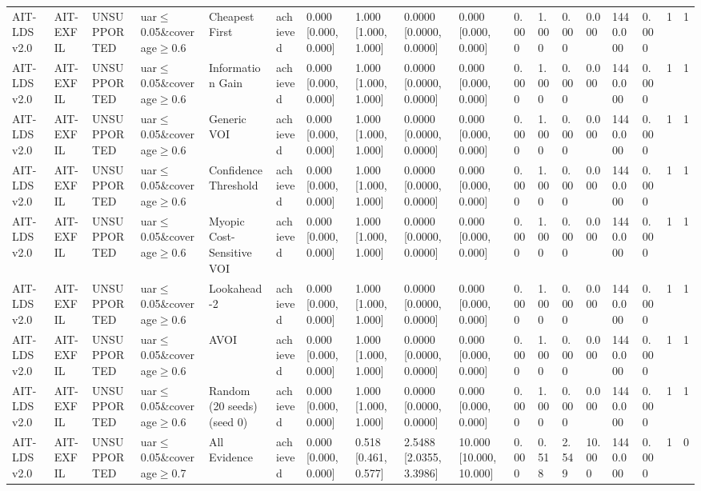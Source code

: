 \begin{table}[!ht]
{\begin{tabular}{llllllllllllllllll}
AIT-LDS v2.0 & AIT-EXFIL & UNSUPPORTED & uar$\le$0.05\&coverage$\ge$0.6 & Cheapest First & achieved & 0.000 [0.000, 0.000] & 1.000 [1.000, 1.000] & 0.0000 [0.0000, 0.0000] & 0.000 [0.000, 0.000] & 0.000 & 1.000 & 0.000 & 0.000 & 1440.000 & 0.000 & 1 & 1 \\
AIT-LDS v2.0 & AIT-EXFIL & UNSUPPORTED & uar$\le$0.05\&coverage$\ge$0.6 & Information Gain & achieved & 0.000 [0.000, 0.000] & 1.000 [1.000, 1.000] & 0.0000 [0.0000, 0.0000] & 0.000 [0.000, 0.000] & 0.000 & 1.000 & 0.000 & 0.000 & 1440.000 & 0.000 & 1 & 1 \\
AIT-LDS v2.0 & AIT-EXFIL & UNSUPPORTED & uar$\le$0.05\&coverage$\ge$0.6 & Generic VOI & achieved & 0.000 [0.000, 0.000] & 1.000 [1.000, 1.000] & 0.0000 [0.0000, 0.0000] & 0.000 [0.000, 0.000] & 0.000 & 1.000 & 0.000 & 0.000 & 1440.000 & 0.000 & 1 & 1 \\
AIT-LDS v2.0 & AIT-EXFIL & UNSUPPORTED & uar$\le$0.05\&coverage$\ge$0.6 & Confidence Threshold & achieved & 0.000 [0.000, 0.000] & 1.000 [1.000, 1.000] & 0.0000 [0.0000, 0.0000] & 0.000 [0.000, 0.000] & 0.000 & 1.000 & 0.000 & 0.000 & 1440.000 & 0.000 & 1 & 1 \\
AIT-LDS v2.0 & AIT-EXFIL & UNSUPPORTED & uar$\le$0.05\&coverage$\ge$0.6 & Myopic Cost-Sensitive VOI & achieved & 0.000 [0.000, 0.000] & 1.000 [1.000, 1.000] & 0.0000 [0.0000, 0.0000] & 0.000 [0.000, 0.000] & 0.000 & 1.000 & 0.000 & 0.000 & 1440.000 & 0.000 & 1 & 1 \\
AIT-LDS v2.0 & AIT-EXFIL & UNSUPPORTED & uar$\le$0.05\&coverage$\ge$0.6 & Lookahead-2 & achieved & 0.000 [0.000, 0.000] & 1.000 [1.000, 1.000] & 0.0000 [0.0000, 0.0000] & 0.000 [0.000, 0.000] & 0.000 & 1.000 & 0.000 & 0.000 & 1440.000 & 0.000 & 1 & 1 \\
AIT-LDS v2.0 & AIT-EXFIL & UNSUPPORTED & uar$\le$0.05\&coverage$\ge$0.6 & AVOI & achieved & 0.000 [0.000, 0.000] & 1.000 [1.000, 1.000] & 0.0000 [0.0000, 0.0000] & 0.000 [0.000, 0.000] & 0.000 & 1.000 & 0.000 & 0.000 & 1440.000 & 0.000 & 1 & 1 \\
AIT-LDS v2.0 & AIT-EXFIL & UNSUPPORTED & uar$\le$0.05\&coverage$\ge$0.6 & Random (20 seeds) (seed 0) & achieved & 0.000 [0.000, 0.000] & 1.000 [1.000, 1.000] & 0.0000 [0.0000, 0.0000] & 0.000 [0.000, 0.000] & 0.000 & 1.000 & 0.000 & 0.000 & 1440.000 & 0.000 & 1 & 1 \\
AIT-LDS v2.0 & AIT-EXFIL & UNSUPPORTED & uar$\le$0.05\&coverage$\ge$0.7 & All Evidence & achieved & 0.000 [0.000, 0.000] & 0.518 [0.461, 0.577] & 2.5488 [2.0355, 3.3986] & 10.000 [10.000, 10.000] & 0.000 & 0.518 & 2.549 & 10.000 & 1440.000 & 0.000 & 1 & 0 \\

\end{tabular}}
\end{table}
